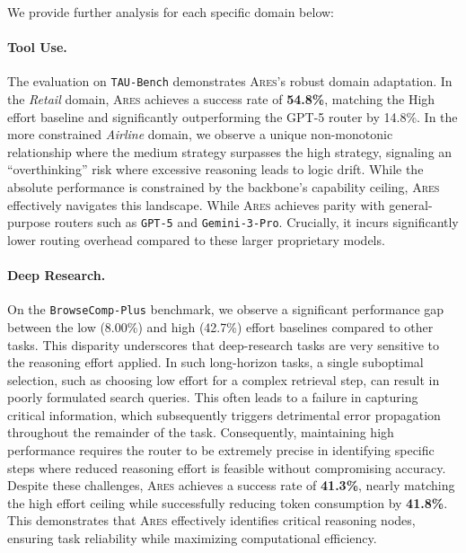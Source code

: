 \documentclass{article}
\newcommand{\ares}{\textsc{Ares}}
\theoremstyle{plain}
\theoremstyle{definition}
\theoremstyle{remark}
\begin{document}
We provide further analysis for each specific domain below:
\paragraph{Tool Use.} 
The evaluation on \texttt{TAU-Bench} demonstrates {\ares}'s robust domain adaptation. In the \textit{Retail} domain, {\ares} achieves a success rate of \textbf{54.8\%}, matching the High effort baseline and significantly outperforming the GPT-5 router by 14.8\%. 
In the more constrained \textit{Airline} domain, we observe a unique non-monotonic relationship where the medium strategy surpasses the high strategy, signaling an ``overthinking'' risk where excessive reasoning leads to logic drift. While the absolute performance is constrained by the backbone's capability ceiling, {\ares} effectively navigates this landscape. While {\ares} achieves parity with general-purpose routers such as \texttt{GPT-5} and \texttt{Gemini-3-Pro}. Crucially, it incurs significantly lower routing overhead compared to these larger proprietary models.

\paragraph{Deep Research.} 
On the \texttt{BrowseComp-Plus} benchmark, we observe a significant performance gap between the low (8.00\%) and high (42.7\%) effort baselines compared to other tasks. This disparity underscores that deep-research tasks are very sensitive to the reasoning effort applied. In such long-horizon tasks, a single suboptimal selection, such as choosing low effort for a complex retrieval step, can result in poorly formulated search queries. This often leads to a failure in capturing critical information, which subsequently triggers detrimental error propagation throughout the remainder of the task. Consequently, maintaining high performance requires the router to be extremely precise in identifying specific steps where reduced reasoning effort is feasible without compromising accuracy. Despite these challenges, {\ares} achieves a success rate of \textbf{41.3\%}, nearly matching the high effort ceiling while successfully reducing token consumption by \textbf{41.8\%}. This demonstrates that {\ares} effectively identifies critical reasoning nodes, ensuring task reliability while maximizing computational efficiency.
\end{document}
